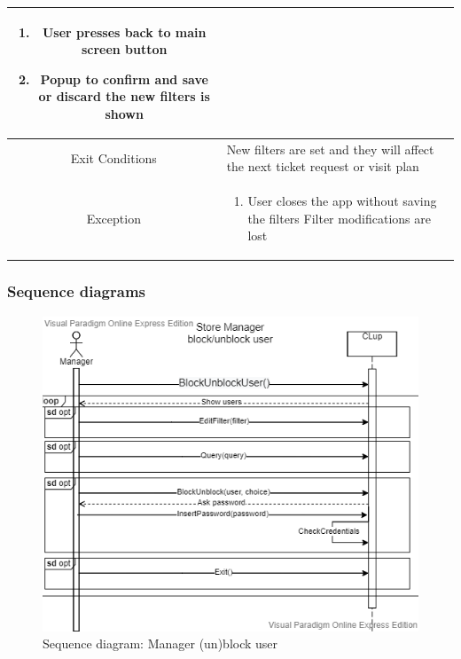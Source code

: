 \begin{enumerate}
\begin{table}[H]
{\begin{tabular}{|c|p{14cm}|}
\begin{enumerate}
				\item User presses back to main screen button
				\item Popup to confirm and save or discard the new filters is shown 
				
			\end{enumerate}\\
			
			\hline
			Exit Conditions & New filters are set and they will affect the next ticket request or visit plan\\
			\hline
			
			Exception & \begin{enumerate}
				\item User closes the app without saving the filters\newline
				Filter modifications are lost
				
			\end{enumerate}\\
			
			\hline
		\end{tabular}
	}
\end{table}

\end{enumerate}

\subsubsection{Sequence diagrams}
\begin{figure}[H]
	\includegraphics[width=\linewidth]{../Diagrams/BlockUser.png}
	\caption{Sequence diagram: Manager (un)block user}
	\label{fig:BlockUser}
\end{figure}

